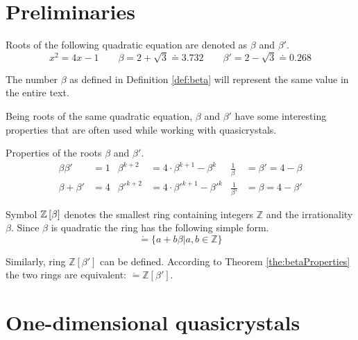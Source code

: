 \documentclass[text.tex]{subfiles}
\begin{document}
\section{Preliminaries}%
\begin{definition}
\label{def:beta}
Roots of the following quadratic equation are denoted as $\beta$ and $\beta'$.
$$x^2=4x-1 \qquad \beta = 2 + \sqrt{3} \doteq 3.732 \qquad \beta' = 2 - \sqrt{3} \doteq 0.268$$
\end{definition}

\begin{remark}
The number $\beta$ as defined in Definition \ref{def:beta} will represent the same value in the entire text.
\end{remark}

Being roots of the same quadratic equation, $\beta$ and $\beta'$ have some interesting properties that are often used while working with quasicrystals. 

\begin{theorem}
\label{the:betaProperties}
Properties of the roots $\beta$ and $\beta'$.
\begin{align*}
\beta\beta' &= 1 &   
\beta^{k+2} &= 4\cdot\beta^{k+1} - \beta^k & 
\frac{1}{\beta} &= \beta' = 4 - \beta \\
\beta + \beta' &= 4 &
{\beta'}^{k+2} &= 4\cdot{\beta'}^{k+1} - {\beta'}^k &
\frac{1}{\beta'} &= \beta = 4 - \beta'
\end{align*}
\end{theorem}

\begin{definition} 
Symbol $\mathbb{Z}\left[\beta\right]$ denotes the smallest ring containing integers $\mathbb{Z}$ and the irrationality $\beta$. Since $\beta$ is quadratic the ring has the following simple form.
$$\ring = \{ a + b\beta |a,b\in \mathbb{Z} \}$$
\end{definition}

\begin{remark}
Similarly, ring $\mathbb{Z}[\beta']$ can be defined. According to Theorem \ref{the:betaProperties} the two rings are equivalent: $\ring = \mathbb{Z}\left[\beta'\right]$.
\end{remark}

\section{One-dimensional quasicrystals}
\end{document}
